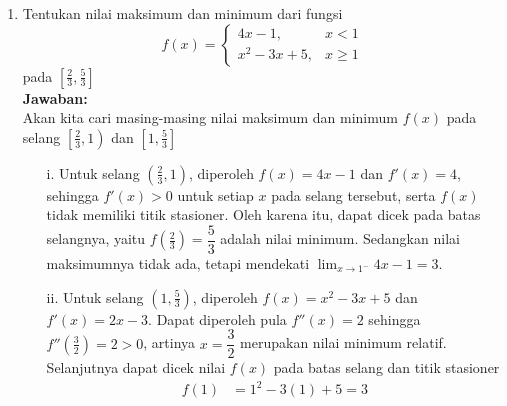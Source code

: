 \documentclass{article}
\begin{document}
\begin{enumerate}
\begin{enumerate}
\begin{enumerate}
\begin{align*}
			y-y_0 &= m(x-x_0) \\
			y &= -1(x-(-3)) \\
			y &= -x-3 \\
			x+y +3&= 0
			\end{align*}
			\item Untuk $x_0=-1$, kita peroleh $y_0=f(x_0)=f(-1)=2$ sehingga persamaan garis singgung di titik tersebut adalah 
			\begin{align*}
			y-y_0 &= m(x-x_0)\\
			y-2 &= -1(x-(-1)) \\
			y &= -x+1 \\
			x+y-1 &= 0
			\end{align*}
		\end{enumerate}
		Jadi terdapat dua titik $(x_0,y_0)$ pada kurva $f(x)$ yang garis singgungnya tegak lurus dengan garis $y=x$, yaitu titik $(-3,0)$ dengan garis singgung $x+y+3=0$ dan titik $(-1,2)$ dengan garis singgung $x+y-1=0$
	\end{enumerate}
	\item Tentukan nilai maksimum dan minimum dari fungsi 
	$$f(x)=\begin{cases} 4x-1, &x<1 \\
	x^2-3x+5, &x\geq 1\end{cases}$$ 
	pada $\left[\frac{2}{3},\frac{5}{3}\right]$
	\\[0.1 cm] \textbf{Jawaban:}\\
	Akan kita cari masing-masing nilai maksimum dan minimum $f(x)$ pada selang $\left[\frac{2}{3},1\right)$ dan $\left[1,\frac{5}{3}\right]$
	\begin{enumerate}
		\item[i.] Untuk selang $\left(\frac{2}{3},1\right)$, diperoleh $f(x)=4x-1$ dan $f'(x)=4$, sehingga $f'(x)>0$ untuk setiap $x$ pada selang tersebut, serta $f(x)$ tidak memiliki titik stasioner. Oleh karena itu, dapat dicek pada batas selangnya, yaitu $f\left(\frac{2}{3}\right)=\dfrac{5}{3}$ adalah nilai minimum. Sedangkan nilai maksimumnya tidak ada, tetapi mendekati $\displaystyle \lim_{x\rightarrow 1^-} 4x-1 = 3$.
		\item[ii.] Untuk selang $\left(1,\frac{5}{3}\right)$, diperoleh $f(x)=x^2-3x+5$ dan $f'(x)=2x-3$. Dapat diperoleh pula $f''(x)=2$ sehingga $f''\left(\frac{3}{2}\right)=2>0$, artinya $x=\dfrac{3}{2}$ merupakan nilai minimum relatif. Selanjutnya dapat dicek nilai $f(x)$ pada batas selang dan titik stasioner 
		\begin{align*}
		f(1)&=1^2-3(1)+5=3 \\

\end{align*}
\end{enumerate}
\end{enumerate}
\end{document}
